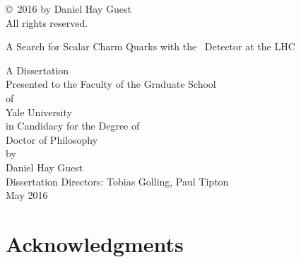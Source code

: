 \documentclass{report}
\title{\titletext}
\author{\authortext}
\newcommand{\titletext}{A Search for Scalar Charm Quarks with the \atlas\ Detector at the LHC}
\newcommand{\abstracttext}{
This thesis presents the results of a search for pair-produced scalar charm quarks with the \atlas\ detector at the LHC.
The search uses $20.3\,\invfb$ of data collected during the $\cmenergy$ 2012 run.
Each charm quark decays to neutralinos and charm quarks, resulting in a final state consisting of two charm jets and missing transverse energy.
A novel ``charm tagging'' algorithm was developed to separate this signature from backgrounds, and is discussed in detail.
As no evidence of physics beyond the standard model is found, the search is used to set exclusions with $95\%$ confidence in the scalar charm vs neutralino mass plane.
}
\newcommand{\authortext}{Daniel Hay Guest}
\begin{document}
\begin{abstract}
  \begin{center}
    \begin{large}
      \titletext \\[0.5em]
    \end{large}
    \authortext \\[0.5em]
    2016 \\[2em]
    \begin{minipage}{\textwidth}
      \doublespacing
      \abstracttext
    \end{minipage}
  \end{center}
\end{abstract}

\thispagestyle{plain}
\null\vspace{3in}
\noindent \copyright\ 2016 by \authortext \\
All rights reserved.
\clearpage

\begin{titlepage}
  \begin{center}
    \begin{huge}
      \titletext \\
    \end{huge}
    \vspace{1in}
    A Dissertation \\
    Presented to the Faculty of the Graduate School \\
    of \\
    Yale University \\
    in Candidacy for the Degree of \\
    Doctor of Philosophy \\
    \vspace{1in}
    by \\
    \authortext \\
    \vspace{1cm}
    Dissertation Directors: Tobias Golling, Paul Tipton \\
    \vspace{1cm}
    May 2016
  \end{center}
\end{titlepage}

\chapter*{Acknowledgments}

\clearpage
\end{document}
